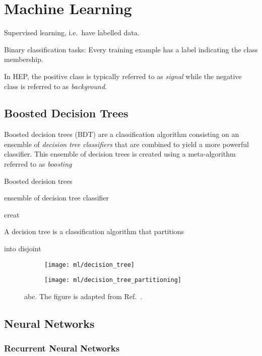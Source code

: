 \section{Machine Learning}

Supervised learning, i.e.\ have labelled data.

Binary classification tasks: Every training example has a label indicating the class membership.

In HEP, the positive class is typically referred to as \emph{signal} while the
negative class is referred to as \emph{background}.



\subsection{Boosted Decision Trees}

Boosted decision trees (BDT) are a classification algorithm consisting on an
ensemble of \emph{decision tree classifiers} that are combined to yield a more
powerful classifier. This ensemble of decision trees is created using a
meta-algorithm referred to as \emph{boosting}






Boosted decision trees


ensemble of decision tree classifier

creat





A decision tree is a classification algorithm that partitions

into disjoint

\begin{figure}[htbp]
  \centering

  \begin{subfigure}{0.46\textwidth}
    \centering
    \texttt{[image: ml/decision\_tree]}
    \caption{}
  \end{subfigure}\hfill%
  \begin{subfigure}{0.46\textwidth}
    \centering
    \texttt{[image: ml/decision\_tree\_partitioning]}
    \caption{}
  \end{subfigure}\hfill%

  \caption{abc. The figure is adapted from Ref.~\cite{hastie09}.}
  \label{fig:decision_tree}
\end{figure}





\subsection{Neural Networks}

\subsubsection{Recurrent Neural Networks}%
\label{sec:rnn}



